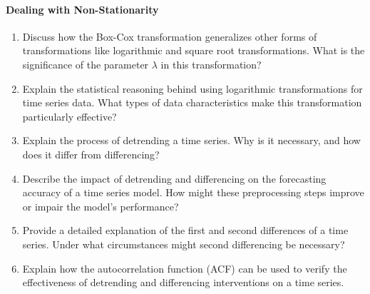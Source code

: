 \paragraph*{Dealing with Non-Stationarity}
\begin{enumerate}
    \item Discuss how the Box-Cox transformation generalizes other forms of transformations like logarithmic and square root transformations. What is the significance of the parameter $\lambda$ in this transformation?
    \item Explain the statistical reasoning behind using logarithmic transformations for time series data. What types of data characteristics make this transformation particularly effective?
    \item Explain the process of detrending a time series. Why is it necessary, and how does it differ from differencing?
    \item Describe the impact of detrending and differencing on the forecasting accuracy of a time series model. How might these preprocessing steps improve or impair the model's performance?
    \item Provide a detailed explanation of the first and second differences of a time series. Under what circumstances might second differencing be necessary?
    \item Explain how the autocorrelation function (ACF) can be used to verify the effectiveness of detrending and differencing interventions on a time series.
\end{enumerate}
